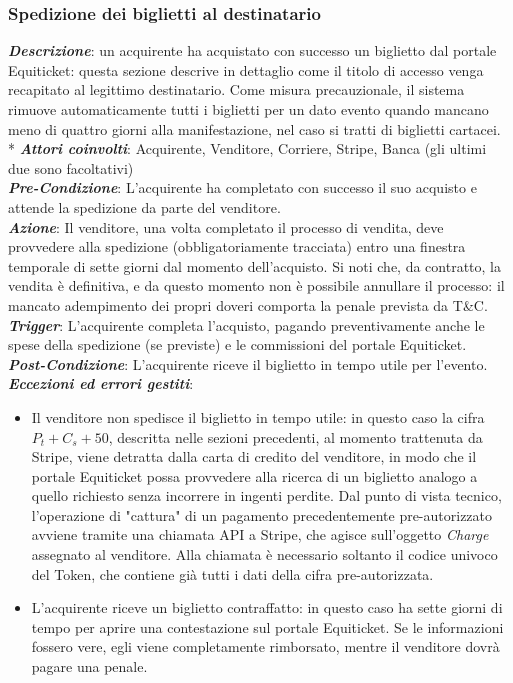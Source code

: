 \subsubsection{Spedizione dei biglietti al destinatario}
\textbf{\textit{Descrizione}}: un acquirente ha acquistato con successo un biglietto dal portale Equiticket: questa sezione descrive in dettaglio come il titolo di accesso venga recapitato al legittimo destinatario. 
Come misura precauzionale, il sistema rimuove automaticamente tutti i biglietti per un dato evento quando mancano meno di quattro giorni alla manifestazione, nel caso si tratti di biglietti cartacei. \\*
\textbf{\textit{Attori coinvolti}}: Acquirente, Venditore, Corriere, Stripe, Banca (gli ultimi due sono facoltativi) \\
\textbf{\textit{Pre-Condizione}}: L'acquirente ha completato con successo il suo acquisto e attende la spedizione da parte del venditore. \\
\textbf{\textit{Azione}}: Il venditore, una volta completato il processo di vendita, deve provvedere alla spedizione (obbligatoriamente tracciata) entro una finestra temporale di sette giorni dal momento dell'acquisto. Si noti che, da contratto, la vendita è definitiva, e da questo momento non è possibile annullare il processo: il mancato adempimento dei propri doveri comporta la penale prevista da T\&C.\\
\textbf{\textit{Trigger}}: L'acquirente completa l'acquisto, pagando preventivamente anche le spese della spedizione (se previste) e le commissioni del portale Equiticket. \\
\textbf{\textit{Post-Condizione}}: L'acquirente riceve il biglietto in tempo utile per l'evento. \\
\textbf{\textit{Eccezioni ed errori gestiti}}: 
\begin{itemize}
	\item Il venditore non spedisce il biglietto in tempo utile: in questo caso la cifra $P_{t} + C_{s} + 50$,  descritta nelle sezioni precedenti, al momento trattenuta da Stripe, viene detratta dalla carta di 		credito del venditore, in modo che il portale Equiticket possa provvedere alla ricerca di un biglietto analogo a quello richiesto senza incorrere in ingenti perdite.
	Dal punto di vista tecnico, l'operazione di "cattura" di un pagamento precedentemente pre-autorizzato avviene tramite una chiamata API a Stripe, che agisce sull'oggetto \textit{Charge} assegnato al venditore. Alla chiamata è necessario soltanto il codice univoco del Token, che contiene già tutti i dati della cifra pre-autorizzata. 
	\item L'acquirente riceve un biglietto contraffatto: in questo caso ha sette giorni di tempo per aprire una contestazione sul portale Equiticket. Se le informazioni fossero vere, egli viene completamente rimborsato, mentre il venditore dovrà pagare una penale. 
\end{itemize}
